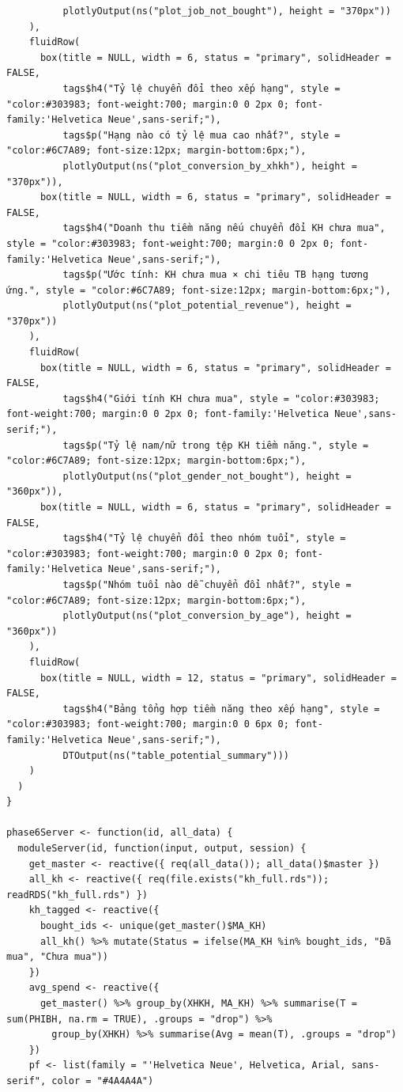 \documentclass[12pt, a4paper]{article}
\begin{document}
\begin{lstlisting}
          plotlyOutput(ns("plot_job_not_bought"), height = "370px"))
    ),
    fluidRow(
      box(title = NULL, width = 6, status = "primary", solidHeader = FALSE,
          tags$h4("Tỷ lệ chuyển đổi theo xếp hạng", style = "color:#303983; font-weight:700; margin:0 0 2px 0; font-family:'Helvetica Neue',sans-serif;"),
          tags$p("Hạng nào có tỷ lệ mua cao nhất?", style = "color:#6C7A89; font-size:12px; margin-bottom:6px;"),
          plotlyOutput(ns("plot_conversion_by_xhkh"), height = "370px")),
      box(title = NULL, width = 6, status = "primary", solidHeader = FALSE,
          tags$h4("Doanh thu tiềm năng nếu chuyển đổi KH chưa mua", style = "color:#303983; font-weight:700; margin:0 0 2px 0; font-family:'Helvetica Neue',sans-serif;"),
          tags$p("Ước tính: KH chưa mua × chi tiêu TB hạng tương ứng.", style = "color:#6C7A89; font-size:12px; margin-bottom:6px;"),
          plotlyOutput(ns("plot_potential_revenue"), height = "370px"))
    ),
    fluidRow(
      box(title = NULL, width = 6, status = "primary", solidHeader = FALSE,
          tags$h4("Giới tính KH chưa mua", style = "color:#303983; font-weight:700; margin:0 0 2px 0; font-family:'Helvetica Neue',sans-serif;"),
          tags$p("Tỷ lệ nam/nữ trong tệp KH tiềm năng.", style = "color:#6C7A89; font-size:12px; margin-bottom:6px;"),
          plotlyOutput(ns("plot_gender_not_bought"), height = "360px")),
      box(title = NULL, width = 6, status = "primary", solidHeader = FALSE,
          tags$h4("Tỷ lệ chuyển đổi theo nhóm tuổi", style = "color:#303983; font-weight:700; margin:0 0 2px 0; font-family:'Helvetica Neue',sans-serif;"),
          tags$p("Nhóm tuổi nào dễ chuyển đổi nhất?", style = "color:#6C7A89; font-size:12px; margin-bottom:6px;"),
          plotlyOutput(ns("plot_conversion_by_age"), height = "360px"))
    ),
    fluidRow(
      box(title = NULL, width = 12, status = "primary", solidHeader = FALSE,
          tags$h4("Bảng tổng hợp tiềm năng theo xếp hạng", style = "color:#303983; font-weight:700; margin:0 0 6px 0; font-family:'Helvetica Neue',sans-serif;"),
          DTOutput(ns("table_potential_summary")))
    )
  )
}

phase6Server <- function(id, all_data) {
  moduleServer(id, function(input, output, session) {
    get_master <- reactive({ req(all_data()); all_data()$master })
    all_kh <- reactive({ req(file.exists("kh_full.rds")); readRDS("kh_full.rds") })
    kh_tagged <- reactive({
      bought_ids <- unique(get_master()$MA_KH)
      all_kh() %>% mutate(Status = ifelse(MA_KH %in% bought_ids, "Đã mua", "Chưa mua"))
    })
    avg_spend <- reactive({
      get_master() %>% group_by(XHKH, MA_KH) %>% summarise(T = sum(PHIBH, na.rm = TRUE), .groups = "drop") %>%
        group_by(XHKH) %>% summarise(Avg = mean(T), .groups = "drop")
    })
    pf <- list(family = "'Helvetica Neue', Helvetica, Arial, sans-serif", color = "#4A4A4A")


\end{lstlisting}
\end{document}
